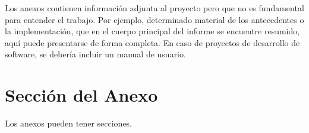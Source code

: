 Los anexos contienen información adjunta al proyecto pero que no es fundamental
para entender el trabajo. Por ejemplo, determinado material de los antecedentes o la
implementación, que en el cuerpo principal del informe se encuentre resumido, aquí
puede presentarse de forma completa. En caso de proyectos de desarrollo de
software, se debería incluir un manual de usuario.

\section{Sección del Anexo}

Los anexos pueden tener secciones.

